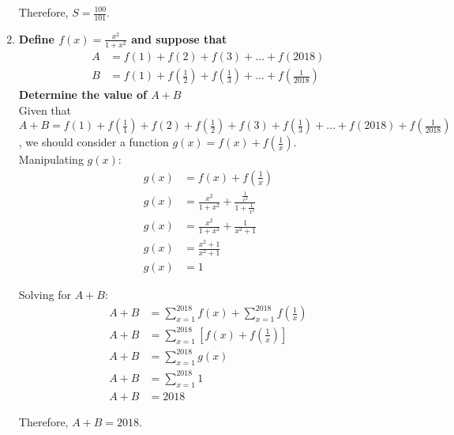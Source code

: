 \documentclass[12pt]{article}
\begin{document}
\begin{enumerate}
    Therefore, $S = \frac{100}{101}$.
    
    \item \textbf{Define $f(x)=\frac{x^2}{1+x^2}$ and suppose that \begin{align*}
        A & = f(1) + f(2) + f(3) + \dots + f(2018) \\
        B & = f(1) + f(\frac{1}{2}) + f(\frac{1}{3}) + \dots + f(\frac{1}{2018})
    \end{align*}
    Determine the value of $A + B$} \\
    
    Given that $A + B = f(1) + f(\frac{1}{1}) + f(2) + f(\frac{1}{2}) + f(3) + f(\frac{1}{3}) + \dots + f(2018) + f(\frac{1}{2018})$, we should consider a function $g(x) = f(x) + f(\frac{1}{x})$. \\
    
    Manipulating $g(x)$:
    \begin{align*}
        g(x) & = f(x) + f(\frac{1}{x}) \\
        g(x) & = \frac{x^2}{1 + x^2} + \frac{\frac{1}{x^2}}{1 + \frac{1}{x^2}} \\
        g(x) & = \frac{x^2}{1 + x^2} + \frac{1}{x^2 + 1} \\
        g(x) & = \frac{x^2 + 1}{x^2 + 1} \\
        g(x) & = 1
    \end{align*}
    
    Solving for $A + B$:
    \begin{align*}
        A + B & = \sum_{x = 1}^{2018} f(x) + \sum_{x = 1}^{2018} f(\frac{1}{x}) \\
        A + B & = \sum_{x = 1}^{2018} [f(x) + f(\frac{1}{x})] \\
        A + B & = \sum_{x = 1}^{2018} g(x) \\
        A + B & = \sum_{x = 1}^{2018} 1 \\
        A + B & = 2018
    \end{align*}
    
    Therefore, $A + B = 2018$.
    
\end{enumerate}
\end{document}
